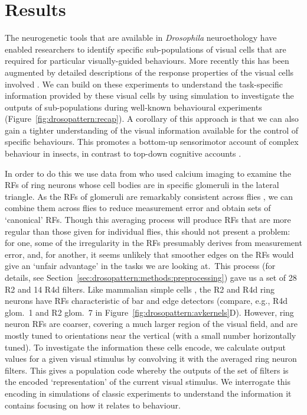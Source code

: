 \section{Results}

The neurogenetic tools that are available in \emph{Drosophila} neuroethology have enabled researchers to identify specific sub-populations of visual cells that are required for particular visually-guided behaviours.
More recently this has been augmented by detailed descriptions of the response properties of the visual cells involved \cite{Seelig2013}.
We can build on these experiments to understand the task-specific information provided by these visual cells by using simulation to investigate the outputs of sub-populations during well-known behavioural experiments (Figure~\ref{fig:drosopattern:recap}).
A corollary of this approach is that we can also gain a tighter understanding of the visual information available for the control of specific behaviours. This promotes a bottom-up sensorimotor account of complex behaviour \cite{Chittka2012,Wystrach2012review} in insects, in contrast to top-down cognitive accounts \cite{AvarguesWeber2011}.

In order to do this we use data from  who used calcium imaging to examine the \acp{RF} of ring neurons whose cell bodies are in specific glomeruli in the lateral triangle. As the RFs of glomeruli are remarkably consistent across flies \cite{Seelig2013}, we can combine them across flies to reduce measurement error and obtain sets of `canonical' RFs. Though this averaging process will produce \acp{RF} that are more regular than those given for individual flies, this should not present a problem: for one, some of the irregularity in the \acp{RF} presumably derives from measurement error, and, for another, it seems unlikely that smoother edges on the \acp{RF} would give an `unfair advantage' in the tasks we are looking at.\ This process (for details, see Section~\ref{sec:drosopattern:methods:preprocessing}) gave us a set of 28 R2 and 14 R4d filters. Like mammalian simple cells \cite{Hubel1962,Wystrach2014CB}, the R2 and R4d ring neurons have RFs characteristic of bar and edge detectors (compare, e.g., R4d glom.~1 and R2 glom.~7 in Figure~\ref{fig:drosopattern:avkernels}D).
However, ring neuron RFs are coarser, covering a much larger region of the visual field, and are mostly tuned to orientations near the vertical (with a small number horizontally tuned). To investigate the information these cells encode, we calculate output values for a given visual stimulus by convolving it with the averaged ring neuron filters. This gives a population code whereby the outputs of the set of filters is the encoded `representation' of the current visual stimulus. We interrogate this encoding in simulations of classic experiments to understand the information it contains focusing on how it relates to behaviour.

